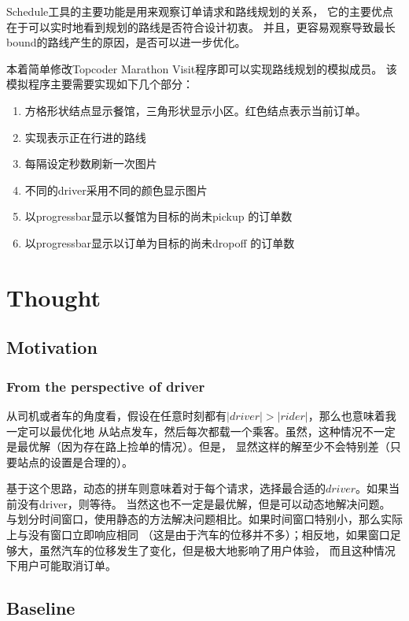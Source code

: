 \documentclass[hyperref,UTF8]{ctexart}
\theoremstyle{definition}
\theoremstyle{remark}
\numberwithin{equation}{subsection}
\begin{document}
Schedule工具的主要功能是用来观察订单请求和路线规划的关系，
它的主要优点在于可以实时地看到规划的路线是否符合设计初衷。
并且，更容易观察导致最长bound的路线产生的原因，是否可以进一步优化。

本着简单修改Topcoder Marathon Visit程序即可以实现路线规划的模拟成员。
该模拟程序主要需要实现如下几个部分：
\begin{enumerate}[(1)]
	\item 方格形状结点显示餐馆，三角形状显示小区。红色结点表示当前订单。
	\item 实现表示正在行进的路线
	\item 每隔设定秒数刷新一次图片
	\item 不同的driver采用不同的颜色显示图片
	\item 以progressbar显示以餐馆为目标的尚未pickup 的订单数
	\item 以progressbar显示以订单为目标的尚未dropoff 的订单数
\end{enumerate}

\section{Thought}
\label{sec:thought}

\subsection{Motivation}

\subsubsection{From the perspective of driver}

从司机或者车的角度看，假设在任意时刻都有$|driver| > |rider|$，那么也意味着我一定可以最优化地
从站点发车，然后每次都载一个乘客。虽然，这种情况不一定是最优解（因为存在路上捡单的情况）。但是，
显然这样的解至少不会特别差（只要站点的设置是合理的）。

基于这个思路，动态的拼车则意味着对于每个请求，选择最合适的$driver$。如果当前没有driver，则等待。
当然这也不一定是最优解，但是可以动态地解决问题。
与划分时间窗口，使用静态的方法解决问题相比。如果时间窗口特别小，那么实际上与没有窗口立即响应相同
（这是由于汽车的位移并不多）；相反地，如果窗口足够大，虽然汽车的位移发生了变化，但是极大地影响了用户体验，
而且这种情况下用户可能取消订单。


\subsection{Baseline}
\label{subsec:baseline}
	
\end{document}
